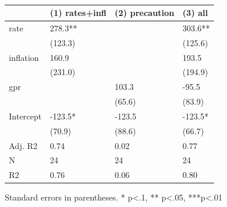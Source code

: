 \begin{table}
\caption{}
\label{}
\begin{center}
\begin{tabular}{llll}
\hline
          & (1) rates+infl & (2) precaution & (3) all  \\
\hline
rate      & 278.3**        &                & 303.6**  \\
          & (123.3)        &                & (125.6)  \\
inflation & 160.9          &                & 193.5    \\
          & (231.0)        &                & (194.9)  \\
gpr       &                & 103.3          & -95.5    \\
          &                & (65.6)         & (83.9)   \\
Intercept & -123.5*        & -123.5         & -123.5*  \\
          & (70.9)         & (88.6)         & (66.7)   \\
Adj. R2   & 0.74           & 0.02           & 0.77     \\
N         & 24             & 24             & 24       \\
R2        & 0.76           & 0.06           & 0.80     \\
\hline
\end{tabular}
\end{center}
\end{table}
\bigskip
Standard errors in parentheses. \newline 
* p<.1, ** p<.05, ***p<.01